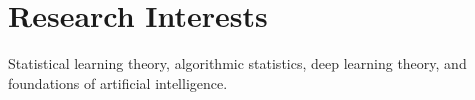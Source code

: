 \section{Research Interests}

Statistical learning theory, algorithmic statistics, deep learning theory, and foundations of artificial intelligence.

